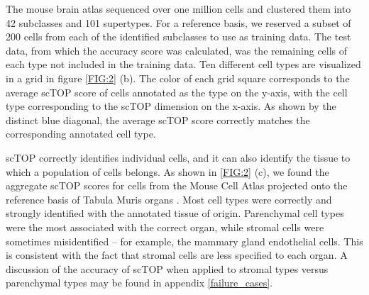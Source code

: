 \documentclass[aps,superscriptaddress, notitlepage,longbibliography]{revtex4-1}
\begin{document}
The mouse brain atlas\cite{yao_taxonomy_2021} sequenced over one million cells and clustered them into 42 subclasses and 101 supertypes. For a reference basis, we reserved a subset of 200 cells from each of the identified subclasses to use as training data. The test data, from which the accuracy score was calculated, was the remaining cells of each type not included in the training data. Ten different cell types are visualized in a grid in figure \ref{FIG:2} (b). The color of each grid square corresponds to the average scTOP score of cells annotated as the type on the y-axis, with the cell type corresponding to the scTOP dimension on the x-axis. As shown by the distinct blue diagonal, the average scTOP score correctly matches the corresponding annotated cell type.

scTOP correctly identifies individual cells, and it can also identify the tissue to which a population of cells belongs. As shown in \ref{FIG:2} (c), we found the aggregate scTOP scores for cells from the Mouse Cell Atlas projected onto the reference basis of Tabula Muris organs \cite{schaum_single-cell_2018}. Most cell types were correctly and strongly identified with the annotated tissue of origin. Parenchymal cell types were the most associated with the correct organ, while stromal cells were sometimes misidentified -- for example, the mammary gland endothelial cells. This is consistent with the fact that stromal cells are less specified to each organ. A discussion of the accuracy of scTOP when applied to stromal types versus parenchymal types may be found in appendix \ref{failure_cases}.
\end{document}
